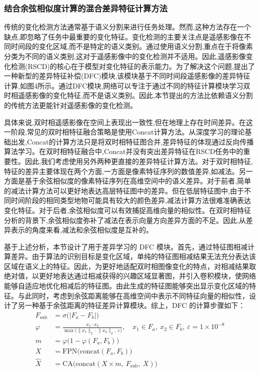 \subsubsection{结合余弦相似度计算的混合差异特征计算方法}

传统的变化检测方法通常基于语义分割来进行任务处理。然而,这种方法存在一个缺点,即忽略了任务中最重要的变化特征。变化检测的主要关注点是遥感影像在不同时间段的变化区域,而不是特定的语义类别。通过使用语义分割,重点在于将像素分类为不同的语义类别,这对于遥感影像中的变化检测并不适用。因此,遥感影像变化检测(RSCD)的核心在于模型对变化特征的表示能力。为了解决这个问题,提出了一种新型的差异特征补偿(DFC)模块,该模块基于不同时间段遥感影像的差异特征计算,如图4所示。通过DFC模块,网络可以专注于通过不同的特征计算模块学习双时相遥感影像的变化特征,而不是语义类别。因此,本节提出的方法比依赖语义分割的传统方法更能针对遥感影像的变化检测。

具体来说,双时相遥感影像在空间上表现出一致性,但在地理上存在时间差异。在这一阶段,常见的双时相特征融合策略是使用Concat计算方法。从深度学习的理论基础出发,Concat的计算方法只是将双时相特征图合并,差异特征的体现通过反向传播算法学习。在双时相特征融合中,Concat并没有突出差异特征在RSCD任务中的重要性。因此,我们考虑使用另外两种更直接的差异特征计算方法。对于双时相特征,特征的差异主要体现在两个方面,一方面是像素特征序列的数值差异,如减法。另一方面是基于余弦相似度的像素特征序列在高维空间中的语义差异。对于前者,简单的减法计算方法可以更好地表达高层特征图中的差异。但在低层特征图中,由于不同时间阶段的相同类型地物可能具有较大的颜色差异,减法计算方法很难准确表达变化特征。对于后者,余弦相似度可以有效捕捉高维向量的相似性。在双时相特征分析的背景下,余弦相似度弥补了减法在表示向量方向差异方面的不足。因此,从差异表示的角度来看,减法和余弦相似度是互补的。

基于上述分析，本节设计了用于差异学习的 DFC 模块。首先，通过特征图相减计算差异。由于算法的识别目标是变化区域，单纯的特征图相减结果无法充分表达该区域在语义上的特征。因此，为更好地适配双时相图像变化的特点，对相减结果取绝对值，以更好地表达通过相减获得的兴趣区域显著图，并引入卷积模块，使网络能够自适应地优化相减后的特征图。由此生成的特征图能够突出显示变化区域的特征。与此同时，考虑到余弦距离能够在高维空间中表示不同特征向量的相似性，设计了另一种基于余弦距离的特征差异计算模块。综上，DFC 的计算步骤如下：
\begin{align}
F_{\mathrm{sub}} &= \sigma\bigl(\lvert F_a - F_b\rvert\bigr) \label{eq:changeclip-13}\\
\varphi &= \frac{x_1 \cdot x_2}{\max\bigl(\lVert x_1\rVert_2 \cdot \lVert x_2\rVert_2,\ \varepsilon\bigr)},\quad x_1\in F_a,\ x_2\in F_b,\ \varepsilon=1\times10^{-8} \label{eq:changeclip-14}\\
m &= \varphi\bigl(1 - \varphi(F_a, F_b)\bigr) \label{eq:changeclip-15}\\
X &= \mathrm{FPN}\bigl(\mathrm{concat}(F_a, F_b)\bigr) \label{eq:changeclip-16}\\
\hat X &= \mathrm{CA}\bigl(\mathrm{concat}(X \times m,\ F_{\mathrm{sub}},\ X)\bigr) \label{eq:changeclip-17}
\end{align}

